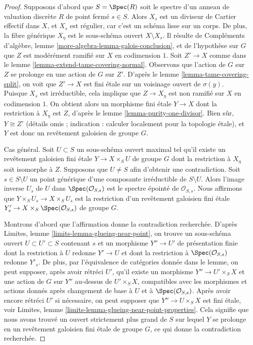\begin{proof}
Supposons d'abord que $S = \Spec(R)$ soit le spectre d'un anneau de valuation discrète $R$
de point fermé $s \in S$. Alors $X_s$ est un diviseur de Cartier effectif
dans $X$, et $X_s$ est régulier, car c'est un schéma lisse sur un corps.
De plus, la fibre générique $X_\eta$ est le sous-schéma ouvert $X \setminus X_s$.
Il résulte de
Compléments d'algèbre, lemme \ref{more-algebra-lemma-galois-conclusion},
et de l'hypothèse sur $G$ que $Z$ est modérément ramifié
sur $X$ en codimension $1$. Soit $Z' \to X$ comme dans le
lemme \ref{lemma-extend-tame-covering-normal}. Observons que
l'action de $G$ sur $Z$ se prolonge en une action de $G$ sur $Z'$.
D'après le lemme \ref{lemma-tame-covering-split},
on voit que $Z' \to X$ est fini \'etale sur un voisinage
ouvert de $\sigma(y)$.
Puisque $X_s$ est irréductible, cela implique que $Z \to X_\eta$
est non ramifié sur $X$ en codimension $1$.
On obtient alors un morphisme fini \'etale $Y \to X$
dont la restriction à $X_\eta$ est $Z$, d'après le
lemme \ref{lemma-purity-one-divisor}.
Bien sûr, $Y \cong Z'$ (détails omis ; indication : calculer localement pour la topologie \'etale),
et $Y$ est donc un revêtement galoisien de groupe $G$.

\medskip\noindent
Cas général. Soit $U \subset S$ un sous-schéma ouvert maximal
tel qu'il existe un revêtement galoisien fini \'etale
$Y \to X \times_S U$ de groupe $G$
dont la restriction à $X_\eta$ soit isomorphe à $Z$.
Supposons que $U \not = S$ afin d'obtenir une contradiction.
Soit $s \in S \setminus U$ un point générique d'une composante irréductible
de $S \setminus U$. Alors l'image inverse $U_s$
de $U$ dans $\Spec(\mathcal{O}_{S, s})$
est le spectre épointé de $\mathcal{O}_{S, s}$.
Nous affirmons que $Y \times_S U_s \to X \times_S U_s$
est la restriction d'un revêtement galoisien fini \'etale
$Y'_s \to X \times_S \Spec(\mathcal{O}_{S, s})$
de groupe $G$.

\medskip\noindent
Montrons d'abord que l'affirmation donne la contradiction recherchée.
D'après Limites, lemme \ref{limits-lemma-glueing-near-point},
on trouve un sous-schéma ouvert $U \subset U' \subset S$
contenant $s$ et un morphisme $Y'' \to U'$ de présentation finie
dont la restriction à $U$ redonne $Y' \to U$ et
dont la restriction à $\Spec(\mathcal{O}_{S, s})$ redonne $Y'_s$.
De plus, par l'équivalence de catégories donnée dans le
lemme, on peut supposer, après avoir rétréci $U'$,
qu'il existe un morphisme $Y'' \to U' \times_S X$
et une action de $G$ sur $Y''$ au-dessus de $U' \times_S X$,
compatibles avec les morphismes et actions donnés après
changement de base à $U$ et à $\Spec(\mathcal{O}_{S, s})$.
Après avoir encore rétréci $U'$ si nécessaire, on peut
supposer que $Y'' \to U \times_S X$ est fini \'etale, voir
Limites, lemme \ref{limits-lemma-glueing-near-point-properties}.
Cela signifie que nous avons trouvé un ouvert strictement plus grand de $S$ sur lequel
$Y$ se prolonge en un revêtement galoisien fini \'etale de groupe $G$,
ce qui donne la contradiction recherchée.


\end{proof}
